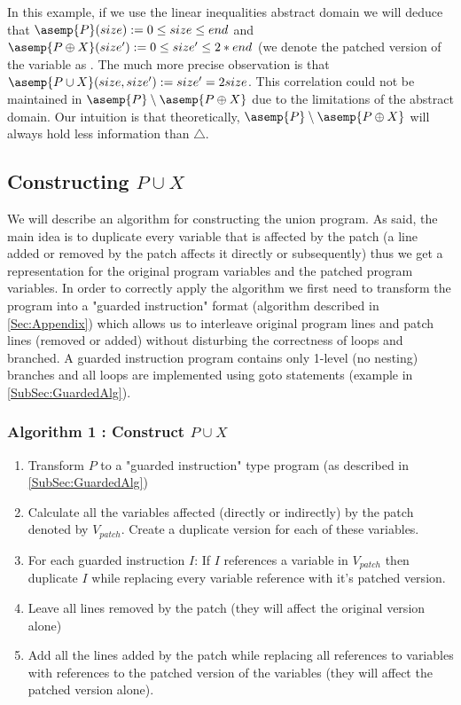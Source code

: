 In this example, if we use the linear inequalities abstract domain we will deduce that $\asemp{P}(size) := 0 \leq size \leq end$ and  $\asemp{P \oplus X}(size') := 0 \leq size' \leq 2*end $ (we denote the patched version of the  variable as . The much more precise observation is that $\asemp{P \cup X}(size,size') :=  size' = 2size $. This correlation could not be maintained in $\asemp{P} \setminus \asemp{P \oplus X}$ due to the limitations of the abstract domain. Our intuition is that theoretically, $\asemp{P} \setminus \asemp{P \oplus X}$ will always hold less information than $\triangle$.

\subsection{Constructing $P \cup X$ }\label{SubSec:Union}
We will describe an algorithm for constructing the union program. As said, the main idea is to duplicate every variable that is affected by the patch (a line added or removed by the patch affects it directly or subsequently) thus we get a representation for the original program variables and the patched program variables.
In order to correctly apply the algorithm we first need to transform the program into a "guarded instruction" format (algorithm described in \ref{Sec:Appendix}) which allows us to interleave original program lines and patch lines (removed or added) without disturbing the correctness of loops and branched. A guarded instruction program contains only 1-level (no nesting) branches and all loops are implemented using goto statements (example in \ref{SubSec:GuardedAlg}).

\subsubsection{Algorithm 1 : Construct $P \cup X$} \label{SubSubSec:UnionAlg}
\begin{enumerate}
\item Transform $P$ to a "guarded instruction" type program (as described in \ref{SubSec:GuardedAlg})
\item Calculate all the variables affected (directly or indirectly) by the patch denoted by $V_{patch}$. Create a duplicate version for each of these variables.
\item For each guarded instruction $I$: If $I$ references a variable in $V_{patch}$ then duplicate $I$ while replacing every variable reference with it's patched version.
\item Leave all lines removed by the patch (they will affect the original version alone)
\item Add all the lines added by the patch while replacing all references to variables with references to the patched version of the variables (they will affect the patched version alone).
\end{enumerate}


